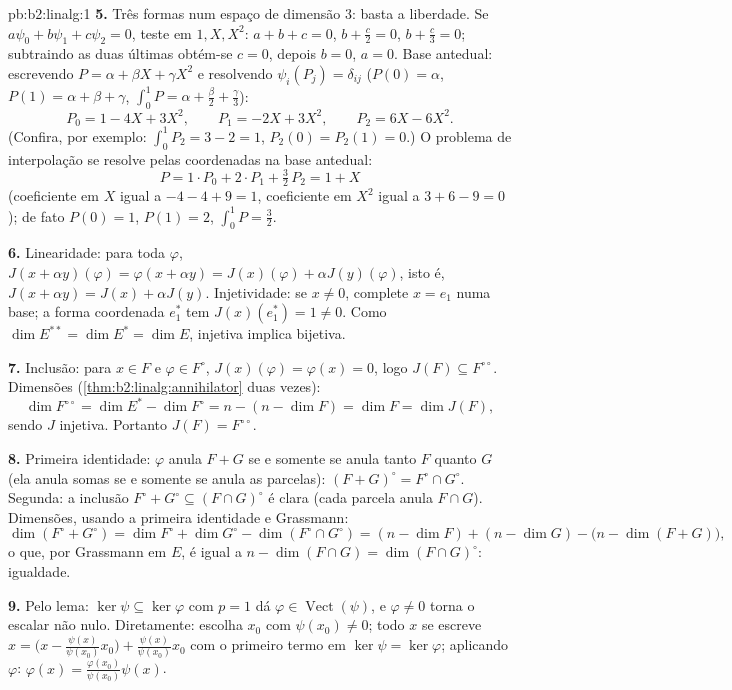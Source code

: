 \begin{solution}{pb:b2:linalg:1}
\textbf{5.} Três formas num espaço de dimensão $3$: basta a
liberdade. Se $a\psi_0 + b\psi_1 + c\psi_2 = 0$, teste em $1, X,
X^2$: $a + b + c = 0$, $b + \frac c2 = 0$, $b + \frac c3 = 0$;
subtraindo as duas últimas obtém-se $c = 0$, depois $b = 0$, $a = 0$.
Base antedual: escrevendo $P = \alpha + \beta X + \gamma X^2$ e
resolvendo $\psi_i(P_j) = \delta_{ij}$ ($P(0) = \alpha$, $P(1) =
\alpha + \beta + \gamma$, $\int_0^1 P = \alpha + \frac\beta2 +
\frac\gamma3$):
\[
P_0 = 1 - 4X + 3X^2, \qquad
P_1 = -2X + 3X^2, \qquad
P_2 = 6X - 6X^2 .
\]
(Confira, por exemplo: $\int_0^1 P_2 = 3 - 2 = 1$, $P_2(0) = P_2(1) = 0$.)
O problema de interpolação se resolve pelas coordenadas na
base antedual:
\[
P = 1\cdot P_0 + 2\cdot P_1 + \tfrac32\, P_2 = 1 + X
\]
(coeficiente em $X$ igual a $-4 - 4 + 9 = 1$, coeficiente em $X^2$ igual a $3 + 6 - 9 =
0$); de fato $P(0) = 1$, $P(1) = 2$, $\int_0^1 P = \frac32$.

\textbf{6.} Linearidade: para toda $\varphi$, $J(x + \alpha
y)(\varphi) = \varphi(x + \alpha y) = J(x)(\varphi) + \alpha
J(y)(\varphi)$, isto é, $J(x + \alpha y) = J(x) + \alpha J(y)$. Injetividade: se $x \neq 0$,
complete $x = e_1$ numa base; a forma coordenada $e_1^*$ tem
$J(x)(e_1^*) = 1 \neq 0$. Como $\dim E^{**} = \dim E^* = \dim
E$, injetiva implica bijetiva.

\textbf{7.} Inclusão: para $x \in F$ e $\varphi \in F^\circ$,
$J(x)(\varphi) = \varphi(x) = 0$, logo $J(F) \subseteq
F^{\circ\circ}$. Dimensões
(\cref{thm:b2:linalg:annihilator} duas vezes):
\[
\dim F^{\circ\circ} = \dim E^* - \dim F^\circ
= n - (n - \dim F) = \dim F = \dim J(F),
\]
sendo $J$ injetiva. Portanto $J(F) = F^{\circ\circ}$.

\textbf{8.} Primeira identidade: $\varphi$ anula $F + G$ se e somente se anula
tanto $F$ quanto $G$ (ela anula somas se e somente se anula as parcelas):
$(F+G)^\circ = F^\circ \cap G^\circ$. Segunda: a inclusão
$F^\circ + G^\circ \subseteq (F \cap G)^\circ$ é clara (cada
parcela anula $F \cap G$). Dimensões, usando a primeira identidade
e Grassmann:
\[
\dim(F^\circ + G^\circ) = \dim F^\circ + \dim G^\circ -
\dim(F^\circ \cap G^\circ)
= (n - \dim F) + (n - \dim G) - \bigl(n - \dim(F +
G)\bigr),
\]
o que, por Grassmann em $E$, é igual a $n - \dim(F \cap G) = \dim(F
\cap G)^\circ$: igualdade.

\textbf{9.} Pelo lema: $\ker\psi \subseteq \ker\varphi$ com
$p = 1$ dá $\varphi \in \operatorname{Vect}(\psi)$, e
$\varphi \neq 0$ torna o escalar não nulo. Diretamente: escolha $x_0$
com $\psi(x_0) \neq 0$; todo $x$ se escreve $x = \bigl(x -
\frac{\psi(x)}{\psi(x_0)}x_0\bigr) + \frac{\psi(x)}{\psi(x_0)}
x_0$ com o primeiro termo em $\ker\psi = \ker\varphi$; aplicando
$\varphi$: $\varphi(x) = \frac{\varphi(x_0)}{\psi(x_0)}\psi(x)$.


\end{solution}
